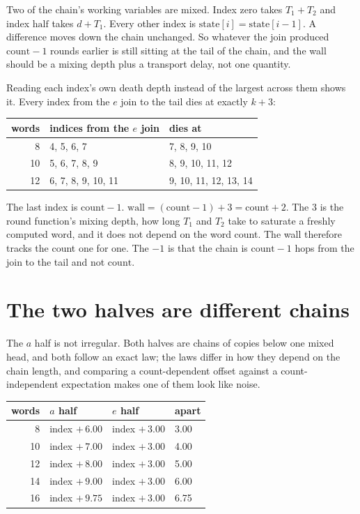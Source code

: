 Two of the chain's working variables are mixed. Index zero takes \(T_1 + T_2\) and index \(\mathrm{half}\) takes \(d + T_1\). Every other index is \(\mathrm{state}[i] = \mathrm{state}[i-1]\). A difference moves down the chain unchanged. So whatever the join produced \(\mathrm{count} - 1\) rounds earlier is still sitting at the tail of the chain, and the wall should be a mixing depth plus a transport delay, not one quantity.

Reading each index's own death depth instead of the largest across them shows it. Every index from the \(e\) join to the tail dies at exactly \(k + 3\):

\begin{center}
\begin{tabular}{rll}
\toprule
words & indices from the \(e\) join & dies at \\
\midrule
8 & 4, 5, 6, 7 & 7, 8, 9, 10 \\
10 & 5, 6, 7, 8, 9 & 8, 9, 10, 11, 12 \\
12 & 6, 7, 8, 9, 10, 11 & 9, 10, 11, 12, 13, 14 \\
\bottomrule
\end{tabular}
\end{center}

The last index is \(\mathrm{count} - 1\). \(\mathrm{wall} = (\mathrm{count} - 1) + 3 = \mathrm{count} + 2\). The \(3\) is the round function's mixing depth, how long \(T_1\) and \(T_2\) take to saturate a freshly computed word, and it does not depend on the word count. The wall therefore tracks the count one for one. The \(-1\) is that the chain is \(\mathrm{count} - 1\) hops from the join to the tail and not \(\mathrm{count}\).

\section{The two halves are different chains}

The \(a\) half is not irregular. Both halves are chains of copies below one mixed head, and both follow an exact law; the laws differ in how they depend on the chain length, and comparing a count-dependent offset against a count-independent expectation makes one of them look like noise.

\begin{center}
\begin{tabular}{rlll}
\toprule
words & \(a\) half & \(e\) half & apart \\
\midrule
8 & index \(+\, 6.00\) & index \(+\, 3.00\) & 3.00 \\
10 & index \(+\, 7.00\) & index \(+\, 3.00\) & 4.00 \\
12 & index \(+\, 8.00\) & index \(+\, 3.00\) & 5.00 \\
14 & index \(+\, 9.00\) & index \(+\, 3.00\) & 6.00 \\
16 & index \(+\, 9.75\) & index \(+\, 3.00\) & 6.75 \\
\bottomrule
\end{tabular}
\end{center}

